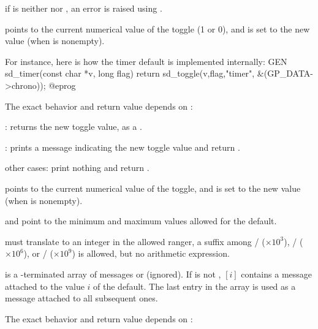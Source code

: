 
\item if  is neither  nor , an error is raised using
.

\item {} points to the current numerical value of the toggle (1 or 0),
and is set to the new value (when  is nonempty).

For instance, here is how the timer default is implemented internally:
\bprog
GEN
sd_timer(const char *v, long flag)
{ return sd_toggle(v,flag,"timer", &(GP_DATA->chrono)); }
@eprog

The exact behavior and return value depends on :

\item {}: returns the new toggle value, as a .

\item {}: prints a message indicating the new toggle value
and return .

\item other cases: print nothing and return .



\item {} points to the current numerical value of the toggle, and is set
to the new value (when  is nonempty).

\item {} and  point to the minimum and maximum values allowed
for the default.

\item {} must translate to an integer in the allowed ranger, a suffix
among
/ ($\times 10^3$),
/ ($\times 10^6$),
or
/ ($\times 10^9$) is allowed, but no arithmetic expression.

\item {} is a \kbd[NULL]-terminated array of messages or 
(ignored). If  is not , $[i]$ contains
a message attached to the value $i$ of the default. The last entry in the
 array is used as a message attached to all subsequent ones.

The exact behavior and return value depends on :

